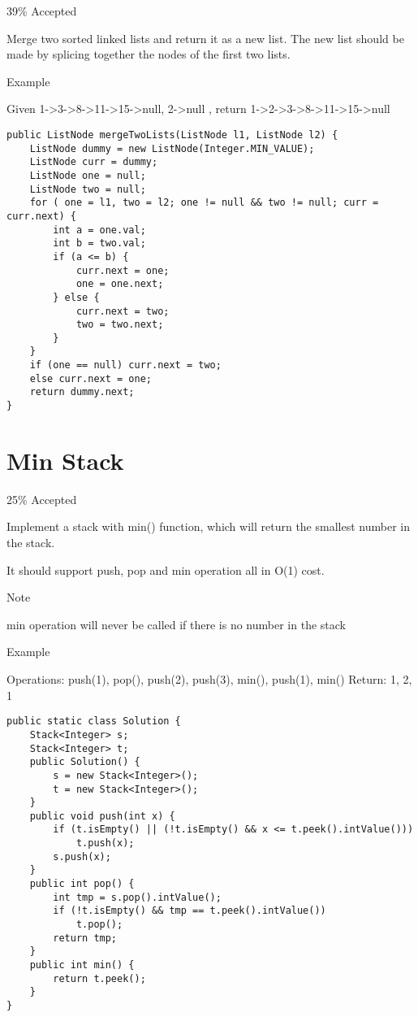 \documentclass[9pt, b5paaper]{book}
\begin{document}
39\% Accepted

Merge two sorted linked lists and return it as a new list. The new list should be made by splicing together the nodes of the first two lists.

Example

Given 1->3->8->11->15->null, 2->null , return 1->2->3->8->11->15->null
\begin{verbatim}
public ListNode mergeTwoLists(ListNode l1, ListNode l2) {
    ListNode dummy = new ListNode(Integer.MIN_VALUE);
    ListNode curr = dummy;
    ListNode one = null;
    ListNode two = null;
    for ( one = l1, two = l2; one != null && two != null; curr = curr.next) {
        int a = one.val;
        int b = two.val;
        if (a <= b) {
            curr.next = one;
            one = one.next;
        } else {
            curr.next = two;
            two = two.next;
        }
    }
    if (one == null) curr.next = two;
    else curr.next = one;
    return dummy.next;
}
\end{verbatim}
\section{Min Stack}
\label{sec-5-46}

25\% Accepted

Implement a stack with min() function, which will return the smallest number in the stack.

It should support push, pop and min operation all in O(1) cost.

Note

min operation will never be called if there is no number in the stack

Example

Operations: push(1), pop(), push(2), push(3), min(), push(1), min()
Return: 1, 2, 1
\begin{verbatim}
public static class Solution {
    Stack<Integer> s;
    Stack<Integer> t;
    public Solution() {
        s = new Stack<Integer>();
        t = new Stack<Integer>();
    }
    public void push(int x) {
        if (t.isEmpty() || (!t.isEmpty() && x <= t.peek().intValue()))
            t.push(x);
        s.push(x);
    }
    public int pop() {
        int tmp = s.pop().intValue();
        if (!t.isEmpty() && tmp == t.peek().intValue())
            t.pop();
        return tmp;
    }
    public int min() {
        return t.peek();
    }
}
\end{verbatim}
\end{document}
